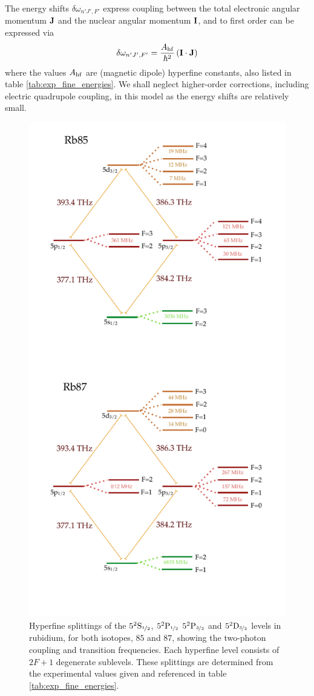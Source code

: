     The energy shifts $\delta \omega_{n' J', F'}$ express coupling between the
    total electronic angular momentum $\bf{J}$ and the nuclear angular momentum
    $\bf{I}$, and to first order can be expressed via
    \begin{equation}
      \delta \omega_{n' J', F'} = 
        \frac{A_{\rm{hf}}}{\hbar^2} \left( \bf{I} \cdot \bf{J} \right)
        \label{eqn:twophoton_energy_shifts}
    \end{equation}
    where the values $A_{\rm{hf}}$ are (magnetic dipole) hyperfine constants,
    also listed in table \ref{tab:exp_fine_energies}. We shall neglect 
    higher-order corrections, including electric quadrupole coupling, in this 
    model as the energy shifts are relatively small.

    \begin{figure}[]
    \centering
    \includegraphics[width=0.7\linewidth]
        {figs/05_twophoton/5spd_energy_levels_vert.pdf}
    \caption{
    Hyperfine splittings of the $5^2\rm{S}_{\nicefrac{1}{2}}$,
    $5^2\rm{P}_{\nicefrac{1}{2}}$ $5^2\rm{P}_{\nicefrac{3}{2}}$ and
    $5^2\rm{D}_{\nicefrac{3}{2}}$ levels in rubidium, for both isotopes, $85$
    and $87$, showing the two-photon coupling and transition frequencies. Each
    hyperfine level consists of $2F + 1$ degenerate sublevels. These splittings
    are determined from the experimental values given and referenced in table
    \ref{tab:exp_fine_energies}.
    }
    \label{fig:5spd_energy_levels}
    \end{figure}

